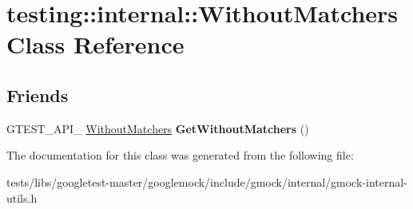 \hypertarget{classtesting_1_1internal_1_1WithoutMatchers}{}\section{testing\+:\+:internal\+:\+:Without\+Matchers Class Reference}
\label{classtesting_1_1internal_1_1WithoutMatchers}
\subsection*{Friends}
\begin{DoxyCompactItemize}
\item 
\mbox{\label{classtesting_1_1internal_1_1WithoutMatchers_aec6c0de08b3c9096e2365c023664a848}} 
G\+T\+E\+S\+T\+\_\+\+A\+P\+I\+\_\+ \hyperlink{classtesting_1_1internal_1_1WithoutMatchers}{Without\+Matchers} {\bfseries Get\+Without\+Matchers} ()
\end{DoxyCompactItemize}


The documentation for this class was generated from the following file\+:\begin{DoxyCompactItemize}
\item 
tests/libs/googletest-\/master/googlemock/include/gmock/internal/gmock-\/internal-\/utils.\+h\end{DoxyCompactItemize}
